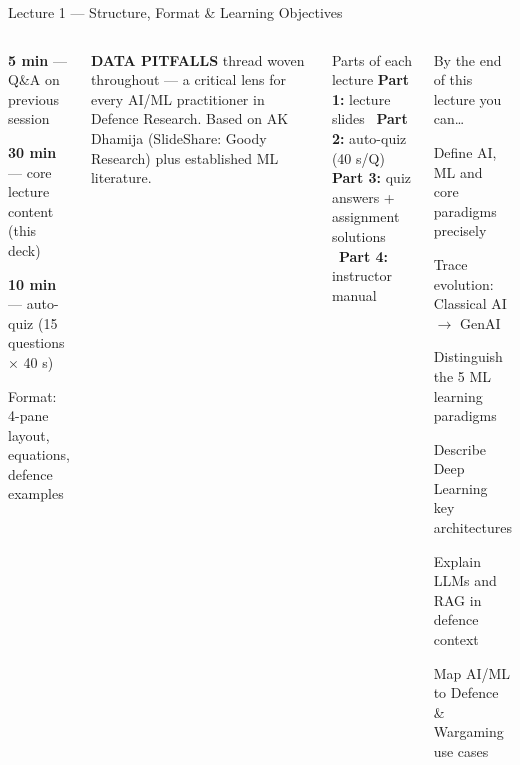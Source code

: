 \documentclass[aspectratio=169,10pt,t]{beamer}
\begin{document}
\begin{frame}{Lecture 1 --- Structure, Format \& Learning Objectives}
\begin{columns}[T]
\begin{tl}\item \textbf{5 min} --- Q\&A on previous session
\item \textbf{30 min} --- core lecture content (this deck)
\item \textbf{10 min} --- auto-quiz (15 questions $\times$ 40 s)
\item Format: 4-pane layout, equations, defence examples\end{tl}
\begin{ibox}\scriptsize\textbf{DATA PITFALLS} thread woven throughout --- a critical lens for every AI/ML practitioner in Defence Research. Based on AK Dhamija (SlideShare: Goody Research) plus established ML literature.\end{ibox}
\begin{cbox}[ISSAnavy]{Parts of each lecture}\scriptsize
\textbf{Part 1:} lecture slides \ \textbf{Part 2:} auto-quiz (40 s/Q)\\\textbf{Part 3:} quiz answers + assignment solutions \ \textbf{Part 4:} instructor manual\end{cbox}
\begin{cbox}{By the end of this lecture you can\ldots}
\begin{te}
\item Define AI, ML and core paradigms precisely
\item Trace evolution: Classical AI $\to$ GenAI
\item Distinguish the 5 ML learning paradigms
\item Describe Deep Learning key architectures
\item Explain LLMs and RAG in defence context
\item Map AI/ML to Defence \& Wargaming use cases

\end{te}
\end{cbox}
\end{columns}
\end{frame}
\end{document}

